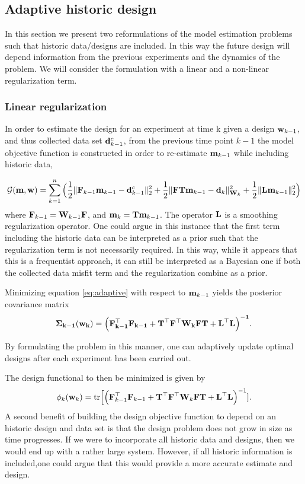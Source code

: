 \documentclass[12pt]{article}
\newcommand {\bfd}   { {\bf d} }
\newcommand {\bfw}   { {\bf w} }
\newcommand {\bfm}   { {\bf m} }
\newcommand{\hf}		 {\frac12}
\newcommand{\bF}  { {\bf F} }      %
\newcommand{\bT}  {\text{\bf T}} %
\newcommand{\bfW}  {\text{{\bf W}}} %
\newcommand{\bfL}  {\text{{\bf L}}} %
\newcommand{\Sig}{\bf \Sigma}
\begin{document}
\subsection{Adaptive historic design}
\label{adaptive}
In this section  we present two reformulations of the model estimation problems such that historic data/designs are included. In this way the future design will depend information from the previous experiments and the dynamics of the problem. We will consider the formulation with a linear and a non-linear regularization term.

\subsubsection{Linear regularization}
In order to  estimate the design for an experiment at time k given a design $\bfw_{k-1}$, and thus  collected data set $\bfd^c_{k-1}$, from the previous time point $k-1$ the  model objective function is constructed in order to re-estimate $\bfm_{k-1}$ while including historic data,

\begin{equation}
\label{eq:adaptive}
\mathcal{G}(\bfm,\bfw) = \sum_{k=1}^{n} \Big (\hf \|\bF_{k-1}\bfm_{k-1} - \bfd^c_{k-1} \|^2_2 + \hf  \| \bF \bT\bfm_{k-1} - \bfd_{k} \|^2_{\bfW_{k}} + \hf \| \bfL\bfm_{k-1} \|^2_2\Big)
\end{equation} 
where $\bF_{k-1} = \bfW_{k-1}\bF$, and $\bfm_{k} = \bT \bfm_{k-1}$. The operator $\bfL$ is a smoothing regularization operator. 
One could argue in this instance that the first term including the historic data can be interpreted as a prior such that the regularization term is not necessarily required. In this way, while it appears that this is a frequentist approach, it can still be interpreted as a Bayesian one if both the collected data misfit term and the regularization combine as a prior.

Minimizing equation \eqref{eq:adaptive} with respect to $\bfm_{k-1}$ yields
the posterior covariance matrix 
\begin{equation}
\label{eq:post}
\Sig_{k-1}(\bfw_k)= \Big( \bF_{k-1}^{\top}\bF_{k-1} +\bT^{\top} \bF^{\top} \bfW_k \bF \bT + \bfL^{\top}\bfL \Big)^{-1}.
\end{equation}

By formulating the problem in this manner, one can adaptively update optimal designs after each experiment has been carried out.
 
The design functional to then be minimized is given by
%
\begin{equation}
  \label{ABk}
  \phi_k(\bfw_k) = \text{tr}\Big[\Big( \bF_{k-1}^{\top}\bF_{k-1} +\bT^{\top} \bF^{\top} \bfW_k \bF \bT + \bfL^{\top}\bfL \Big)^{-1}].
  \end{equation} 
A second benefit of building the design objective function to depend  on an historic design and data set is that the design problem does not grow in size as time progresses.  If we were to incorporate all historic data and designs, then we would end up with a rather large system. However, if all historic information is included,one could argue that this would provide a more accurate estimate and design.
 
\end{document}
